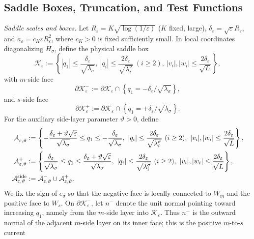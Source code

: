 \documentclass[11pt]{article}
\numberwithin{equation}{section}
\theoremstyle{plain}
\theoremstyle{definition}
\theoremstyle{remark}
\newcommand{\eps}{\varepsilon}
\begin{document}
\subsection{Saddle Boxes, Truncation, and Test Functions}
\label{app:truncation}

\emph{Saddle scales and boxes.}  Let
$R_\eps=K\sqrt{\log(1/\eps)}$ ($K$ fixed, large),
$\delta_\eps=\sqrt\eps R_\eps$, and
$a_\eps=c_K\eps R_\eps^2$, where $c_K>0$ is fixed sufficiently small.
In local coordinates diagonalizing $H_\sigma$, define the physical saddle box
\begin{equation}
\label{eq:logarithmic-saddle-box}
\mathcal K_\eps:=\left\{|q_1|\le\frac{\delta_\eps}{\sqrt{\lambda_\sigma}},\
|q_i|\le\frac{2\delta_\eps}{\sqrt{\lambda_i^\sigma}}\ (i\ge2),\
|v_i|,|w_i|\le\frac{2\delta_\eps}{\sqrt L}\right\},
\end{equation}
with $m$-side face
\[
\partial\mathcal K_\eps^-
:=\partial\mathcal K_\eps\cap
\left\{q_1=-\delta_\eps/\sqrt{\lambda_\sigma}\right\},
\]
and
$s$-side face
\[
\partial\mathcal K_\eps^+
:=\partial\mathcal K_\eps\cap
\left\{q_1=+\delta_\eps/\sqrt{\lambda_\sigma}\right\}.
\]
For the auxiliary side-layer parameter $\vartheta>0$, define
\begin{equation}
\label{eq:physical-side-layers}
\begin{aligned}
\mathcal A_{\eps,\vartheta}^-
&:=
\left\{
-\frac{\delta_\eps+\vartheta\sqrt\eps}{\sqrt{\lambda_\sigma}}
\le q_1\le
-\frac{\delta_\eps}{\sqrt{\lambda_\sigma}},\
|q_i|\le\frac{2\delta_\eps}{\sqrt{\lambda_i^\sigma}}\ (i\ge2),\
|v_i|,|w_i|\le\frac{2\delta_\eps}{\sqrt L}
\right\},\\
\mathcal A_{\eps,\vartheta}^+
&:=
\left\{
\frac{\delta_\eps}{\sqrt{\lambda_\sigma}}
\le q_1\le
\frac{\delta_\eps+\vartheta\sqrt\eps}{\sqrt{\lambda_\sigma}},\
|q_i|\le\frac{2\delta_\eps}{\sqrt{\lambda_i^\sigma}}\ (i\ge2),\
|v_i|,|w_i|\le\frac{2\delta_\eps}{\sqrt L}
\right\},\\
\mathcal A_{\eps,\vartheta}^{\rm side}
&:=\mathcal A_{\eps,\vartheta}^-\cup\mathcal A_{\eps,\vartheta}^+.
\end{aligned}
\end{equation}
We fix the sign of $e_\sigma$ so that the negative face is locally connected
to $W_m$ and the positive face to $W_s$.
On $\partial\mathcal K_\eps^-$, let $n^-$ denote the unit normal pointing
toward increasing $q_1$, namely from the $m$-side layer into
$\mathcal K_\eps$.  Thus $n^-$ is the outward normal of the adjacent
$m$-side layer on its inner face; this is the positive $m$-to-$s$ current
\end{document}

